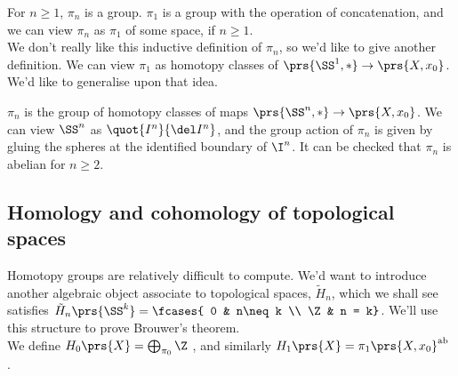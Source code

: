 \documentclass[10pt,a4paper,twoside,openany,hidelinks]{book}
\begin{document}
For $n \geq 1$, $\pi_n$ is a group. $\pi_1$ is a group with the operation of concatenation, and we can view $\pi_n$ as $\pi_1$ of some space, if $n \geq 1$. \\
We don't really like this inductive definition of $\pi_n$, so we'd like to give another definition. We can view $\pi_1$ as homotopy classes of $\prs{\SS^1, *} \to \prs{X, x_0}$. We'd like to generalise upon that idea. \\
\begin{definition}
$\pi_n$ is the group of homotopy classes of maps $\prs{\SS^n, *} \to \prs{X, x_0}$. We can view $\SS^n$ as $\quot{I^n}{\del I^n}$, and the group action of $\pi_n$ is given by gluing the spheres at the identified boundary of $\I^n$. It can be checked that $\pi_n$ is abelian for $n \geq 2$.
\end{definition}

\subsection{Homology and cohomology of topological spaces}
Homotopy groups are relatively difficult to compute. We'd want to introduce another algebraic object associate to topological spaces, $\tilde{H}_n$, which we shall see satisfies $\tilde{H}_n\prs{\SS^k} = \fcases{ 0 & n\neq k \\ \Z & n = k}$. We'll use this structure to prove Brouwer's theorem. \\
We define $H_0\prs{X} = \bigoplus_{\pi_0} \Z$ , and similarly  $H_1\prs{X} = \pi_1\prs{X,x_0}^{\mathrm{ab}}$ .
\backmatter
\end{document}
